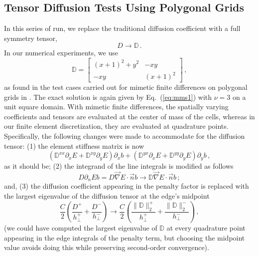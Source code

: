 \documentclass[preprint,10pt]{elsarticle}
\newcommand{\grad}{\vec{\nabla}}
\newcommand{\vn}{\vec{n}}
\newcommand{\eig}[1]{\| #1 \|_2}
\newcommand{\eqt}[1]{Eq.~(\ref{#1})}                     %
\newcommand{\tf}{b}
\begin{document}
\pagebreak

\subsection{Tensor Diffusion Tests Using Polygonal Grids} \label{sec:results_tens}

In this series of run, we replace the traditional diffusion coefficient with a full symmetry tensor,
\begin{equation}
  D \longrightarrow \mathbb{D} \,.
\end{equation}
In our numerical experiments, we use
\begin{equation}
  \mathbb{D}  =  
  \begin{bmatrix}
  (x+1)^2+y^2 & -xy \\
    -xy       & (x+1)^2
  \end{bmatrix}
  \, ,
\end{equation}
as found in the test cases carried out for mimetic finite differences on polygonal grids in \cite{Kuznetsov2004,Brezzi2005}.
The exact solution is again given by \eqt{eq:mms1} with $\nu=3$ on a unit square domain.
With mimetic finite differences, the spatially varying coefficients and tensors are evaluated at the center of mass of
the cells, whereas in our finite element discretization, they are evaluated at quadrature points. Specifically,
the following changes were made to accommodate for the diffusion tensor: (1) the element stiffness matrix is now
\begin{equation}
  \left( \mathbb{D}^{xx} \partial_x E +\mathbb{D}^{xy} \partial_y E \right) \partial_x \tf +
  \left( \mathbb{D}^{yx} \partial_x E +\mathbb{D}^{yy} \partial_y E \right) \partial_y \tf  \, ,
 \end{equation}
as it should be; (2) the integrand of the line integrals is modified as follows
\begin{equation}
 D\partial_n E \tf  = D\grad E \cdot \vn \tf  \longrightarrow  \mathbb{D}\grad E \cdot \vn \tf \, ;
\end{equation}
and, (3) the diffusion coefficient appearing in the penalty factor is replaced with the largest eigenvalue of
the diffusion tensor at the edge's midpoint
\begin{equation}
\frac{C}{2} \left( \frac{D^+}{h_\bot^+} + \frac{D^-}{h_\bot^-} \right)
 \longrightarrow  \frac{C}{2} \left( \frac{\eig{\mathbb{D}}^+}{h_\bot^+} + \frac{\eig{\mathbb{D}}^-}{h_\bot^-} \right)
 \, ,
\end{equation}
(we could have computed the largest eigenvalue of $\mathbb{D}$ at every quadrature point appearing in the edge
integrals of the penalty term, but choosing the midpoint value avoids doing this while preserving second-order convergence).
\end{document}
